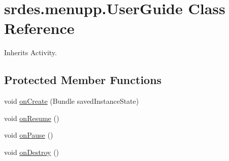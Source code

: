 \hypertarget{classsrdes_1_1menupp_1_1_user_guide}{\section{srdes.\-menupp.\-User\-Guide \-Class \-Reference}
\label{classsrdes_1_1menupp_1_1_user_guide}
}


\-Inherits \-Activity.

\subsection*{\-Protected \-Member \-Functions}
\begin{DoxyCompactItemize}
\item 
void \hyperlink{classsrdes_1_1menupp_1_1_user_guide_af579582759dbf95e09717162489c4b74}{on\-Create} (\-Bundle saved\-Instance\-State)
\item 
void \hyperlink{classsrdes_1_1menupp_1_1_user_guide_ad9b440fda473799cd46dd974ab02d541}{on\-Resume} ()
\item 
void \hyperlink{classsrdes_1_1menupp_1_1_user_guide_a6cfb137d6fff59f999bf31c946bb0403}{on\-Pause} ()
\item 
void \hyperlink{classsrdes_1_1menupp_1_1_user_guide_ada7dbc91f34b8c8594c03cef0f574a7e}{on\-Destroy} ()
\end{DoxyCompactItemize}


